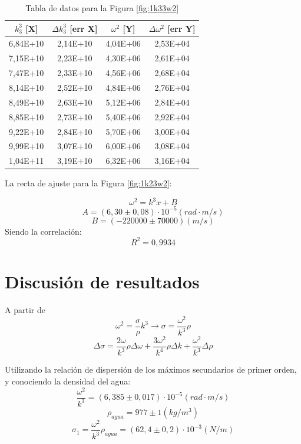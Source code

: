 \documentclass[a4paper,12pt,spanish]{article}
\begin{document}
	\begin{table}[H]
		\centering
		\begin{tabular}{|c|c|c|c|}\hline
			$k_3^3$ [X] & $\Delta k_3^3$ [err X] & $\omega^2$ [Y] & $\Delta \omega^2$ [err Y] \\ \hline
			6,84E+10 & 2,14E+10 & 4,04E+06 & 2,53E+04 \\\hline
			7,15E+10 & 2,23E+10 & 4,30E+06 & 2,61E+04 \\\hline
			7,47E+10 & 2,33E+10 & 4,56E+06 & 2,68E+04 \\\hline
			8,14E+10 & 2,52E+10 & 4,84E+06 & 2,76E+04 \\\hline
			8,49E+10 & 2,63E+10 & 5,12E+06 & 2,84E+04 \\\hline
			8,85E+10 & 2,73E+10 & 5,40E+06 & 2,92E+04 \\\hline
			9,22E+10 & 2,84E+10 & 5,70E+06 & 3,00E+04 \\\hline
			9,99E+10 & 3,07E+10 & 6,00E+06 & 3,08E+04 \\\hline
			1,04E+11 & 3,19E+10 & 6,32E+06 & 3,16E+04\\ \hline
		\end{tabular}
	\caption{Tabla de datos para la Figura \ref{fig:1k33w2}}
	\end{table}

	
	La recta de ajuste para la Figura \ref{fig:1k23w2}:
	
	\[ \omega^2 = k^3 x +B
	\]
	\[A = (6,30 \pm 0,08) \cdot 10^{-5} \si{(rad\cdot m/s)}       %
	\]
	\[ B = (-220000\pm 70000)\si{(m/s)}    
	\]
	Siendo la correlación:
	\[ R^2 =  0,9934
	\]

	
	
	\section{Discusión de resultados}
	

	
	A partir de 
	\[ \omega^2 = \frac{\sigma}{\rho} k^3 \longrightarrow \sigma = \frac{\omega^2}{k^3}\rho
	\]
	\[ \Delta \sigma = \frac{2\omega}{k^3}\rho \Delta \omega + \frac{3\omega^2}{k^4}\rho\Delta k + \frac{\omega^2}{k^3}\Delta \rho
	\]
	
	
	Utilizando la relación de dispersión de los máximos secundarios de primer orden, y conociendo la densidad del agua:
	\[ \frac{\omega^2}{k^3} = (6,385 \pm 0,017) \cdot 10^{-5} \si{(rad\cdot m/s)} 
	\]
	\[\rho_{agua} = 977\pm 1\si{(kg/m^3)}
	\]
	\[ \sigma_1 = \frac{\omega^2}{k^3} \rho_{agua}= (62,4\pm 0,2)\cdot 10^{-3}\si{(N/m)}
	\]
	
\end{document}
